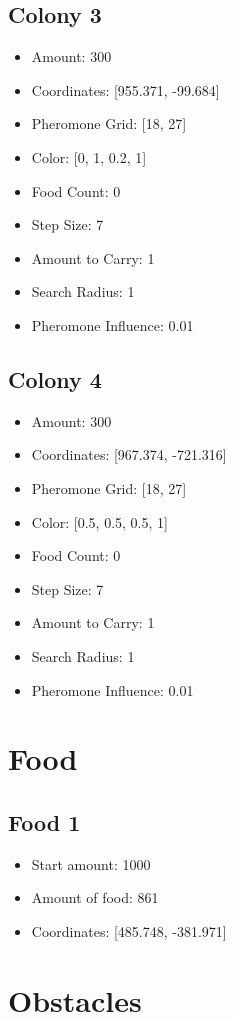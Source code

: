 \documentclass{article}
\begin{document}
\subsection*{Colony 3}
\begin{itemize}
\item Amount: 300
\item Coordinates: [955.371, -99.684]
\item Pheromone Grid: [18, 27]
\item Color: [0, 1, 0.2, 1]
\item Food Count: 0
\item Step Size: 7
\item Amount to Carry: 1
\item Search Radius: 1
\item Pheromone Influence: 0.01
\end{itemize}
\subsection*{Colony 4}
\begin{itemize}
\item Amount: 300
\item Coordinates: [967.374, -721.316]
\item Pheromone Grid: [18, 27]
\item Color: [0.5, 0.5, 0.5, 1]
\item Food Count: 0
\item Step Size: 7
\item Amount to Carry: 1
\item Search Radius: 1
\item Pheromone Influence: 0.01
\end{itemize}


    \section{Food}

    \subsection*{Food 1}
\begin{itemize}
\item Start amount: 1000
\item Amount of food: 861
\item Coordinates: [485.748, -381.971]
\end{itemize}


    \section{Obstacles}
\end{document}
